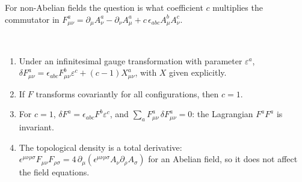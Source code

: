 For non-Abelian fields the question is what coefficient $c$ multiplies the commutator in $F^a_{\mu\nu}=\partial_\mu A^a_\nu-\partial_\nu A^a_\mu+c\,\epsilon_{abc}A^b_\mu A^c_\nu$.

\begin{theorem}\label{thm:utiyama}\ver\
\begin{enumerate}[label=(\roman*)]
\item Under an infinitesimal gauge transformation with parameter $\varepsilon^a$, $\delta F^a_{\mu\nu}=\epsilon_{abc}F^b_{\mu\nu}\varepsilon^c+(c-1)X^a_{\mu\nu}$, with $X$ given explicitly.
\item If $F$ transforms covariantly for all configurations, then $c=1$.
\item For $c=1$, $\delta F^a=\epsilon_{abc}F^b\varepsilon^c$, and $\sum_aF^a_{\mu\nu}\,\delta F^a_{\mu\nu}=0$: the Lagrangian $F^aF^a$ is invariant.
\item The topological density is a total derivative: $\epsilon^{\mu\nu\rho\sigma}F_{\mu\nu}F_{\rho\sigma}=4\,\partial_\mu(\epsilon^{\mu\nu\rho\sigma}A_\nu\partial_\rho A_\sigma)$ for an Abelian field, so it does not affect the field equations.
\end{enumerate}
\end{theorem}
